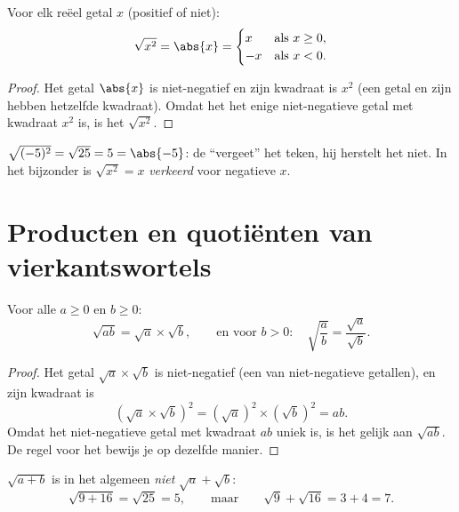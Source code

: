 \begin{proposition}\label{prop:g9:sqrt:square}
Voor elk reëel getal $x$ (positief of niet):
\[
\sqrt{x^2} = \abs{x} =
\begin{cases}
x & \text{als } x \geq 0,\\
-x & \text{als } x < 0 .
\end{cases}
\]
\end{proposition}

\begin{proof}
Het getal $\abs{x}$ is niet-negatief en zijn kwadraat is $x^2$ (een getal en zijn
 hebben hetzelfde kwadraat). Omdat het het enige niet-negatieve getal
met kwadraat $x^2$ is, is het $\sqrt{x^2}$.
\end{proof}

\begin{example}
$\sqrt{(-5)^2} = \sqrt{25} = 5 = \abs{-5}$: de  ``vergeet'' het
teken, hij herstelt het niet. In het bijzonder is $\sqrt{x^2} = x$ \emph{verkeerd}
voor negatieve $x$.
\end{example}

\section{Producten en quotiënten van vierkantswortels}

\begin{theorem}\label{thm:g9:sqrt:rules}
Voor alle $a \geq 0$ en $b \geq 0$:
\[
\sqrt{a b} = \sqrt a \times \sqrt b,
\qquad\text{en voor } b > 0:\quad
\sqrt{\frac ab} = \frac{\sqrt a}{\sqrt b} .
\]
\end{theorem}

\begin{proof}
Het getal $\sqrt a \times \sqrt b$ is niet-negatief (een  van
niet-negatieve getallen), en zijn kwadraat is
\[
\left(\sqrt a \times \sqrt b\right)^2
= \left(\sqrt a\right)^2 \times \left(\sqrt b\right)^2
= a b .
\]
Omdat het niet-negatieve getal met kwadraat $ab$ uniek is, is het gelijk aan
$\sqrt{ab}$. De regel voor het  bewijs je op dezelfde manier.
\end{proof}

\begin{remark}
$\sqrt{a + b}$ is in het algemeen \emph{niet} $\sqrt a + \sqrt b$:
\[
\sqrt{9 + 16} = \sqrt{25} = 5,
\qquad\text{maar}\qquad
\sqrt 9 + \sqrt{16} = 3 + 4 = 7 .
\]
\end{remark}

